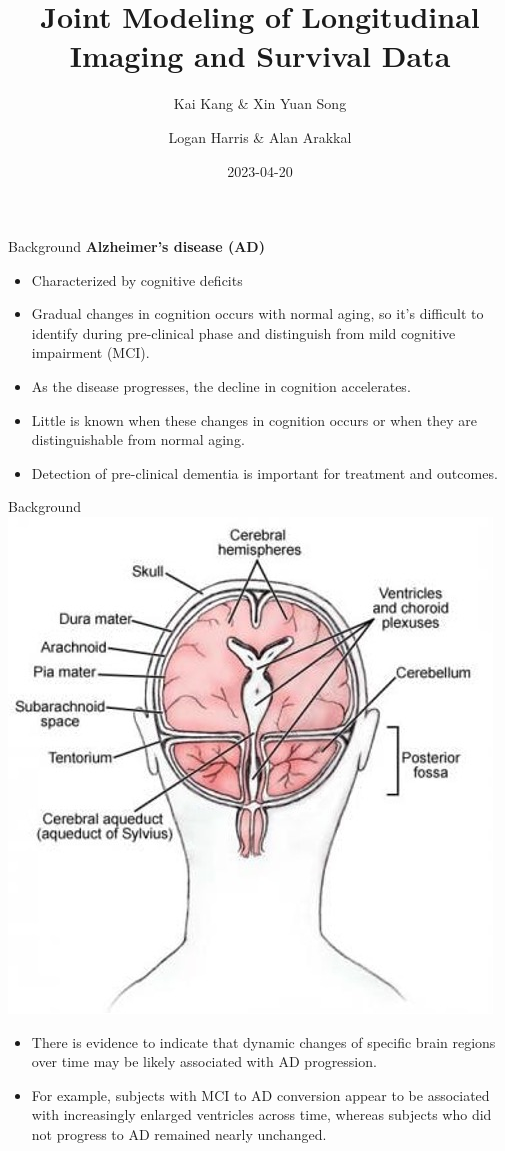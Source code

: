 \documentclass[
  ignorenonframetext,
]{beamer}
\title{Joint Modeling of Longitudinal Imaging and Survival Data}
\subtitle{Kai Kang \& Xin Yuan Song}
\author{Logan Harris \& Alan Arakkal}
\date{2023-04-20}
\providecommand{\tightlist}{%
  \setlength{\itemsep}{0pt}\setlength{\parskip}{0pt}}
\begin{document}
\frame{\titlepage}

\begin{frame}{Background}
\protect\hypertarget{background}{}
\textbf{Alzheimer's disease (AD)}

\begin{itemize}
\tightlist
\item
  Characterized by cognitive deficits
\item
  Gradual changes in cognition occurs with normal aging, so it's
  difficult to identify during pre-clinical phase and distinguish from
  mild cognitive impairment (MCI).
\item
  As the disease progresses, the decline in cognition accelerates.
\item
  Little is known when these changes in cognition occurs or when they
  are distinguishable from normal aging.
\item
  Detection of pre-clinical dementia is important for treatment and
  outcomes.
\end{itemize}
\end{frame}

\begin{frame}{Background}
\protect\hypertarget{background-1}{}
\includegraphics[width=0.5\linewidth,height=0.5\textheight,style="float:right; padding:10px"]{images/fig1}

\begin{itemize}
\item
  There is evidence to indicate that dynamic changes of specific brain
  regions over time may be likely associated with AD progression.
\item
  For example, subjects with MCI to AD conversion appear to be
  associated with increasingly enlarged ventricles across time, whereas
  subjects who did not progress to AD remained nearly unchanged.
\end{itemize}
\end{frame}
\end{document}
